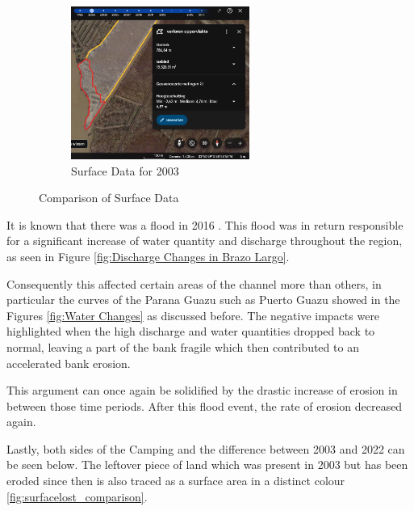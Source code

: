 \begin{figure}[H]
    \hfill
    \begin{subfigure}[b]{0.45\textwidth} %
        \includegraphics[width=\linewidth, height=5cm]{figures/appendix-g/verlorenopp2003.png}
        \caption{Surface Data for 2003}
        \label{fig:surface2003.2}
    \end{subfigure}
    \caption{Comparison of Surface Data}
    \label{fig:surface_comparison}
\end{figure}

It is known that there was a flood in 2016 \autocite{ArgentinaInundacionesDesde2016}. This flood was in return responsible for a significant increase of water quantity and discharge throughout the region, as seen in Figure \ref{fig:Discharge Changes in Brazo Largo}.

Consequently this affected certain areas of the channel more than others, in particular the curves of the Parana Guazu such as Puerto Guazu showed in the Figures \ref{fig:Water Changes} as discussed before. The negative impacts were highlighted when the high discharge and water quantities dropped back to normal, leaving a part of the bank fragile which then contributed to an accelerated bank erosion.



This argument can once again be solidified by the drastic increase of erosion in between those time periods. After this flood event, the rate of erosion decreased again.

Lastly, both sides of the Camping and the difference between 2003 and 2022 can be seen below. The leftover piece of land which was present in 2003 but has been eroded since then is also traced as a surface area in a distinct colour \ref{fig:surfacelost_comparison}. 

